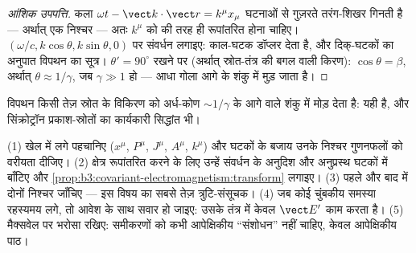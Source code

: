 \begin{proof}[आंशिक उपपत्ति]
कला $\omega t - \vect k\cdot\vect r = k^\mu x_\mu$ घटनाओं से गुज़रते
तरंग-शिखर गिनती है --- अर्थात् एक निश्चर --- अतः $k^\mu$ को
 की तरह ही रूपांतरित होना चाहिए। $(\omega/c, k\cos\theta,
k\sin\theta, 0)$ पर संवर्धन लगाइए: काल-घटक डॉप्लर देता है, और
दिक्-घटकों का अनुपात विपथन का सूत्र। $\theta' =
90^\circ$ रखने पर (अर्थात् स्रोत-तंत्र की बगल वाली किरण): $\cos\theta =
\beta$, अर्थात् $\theta \approx 1/\gamma$, जब $\gamma \gg 1$ हो ---
आधा गोला आगे के शंकु में मुड़ जाता है।
\end{proof}

\begin{omfigure}

{\small विपथन किसी तेज़ स्रोत के विकिरण को अर्ध-कोण $\sim 1/\gamma$ के
आगे वाले शंकु में मोड़ देता है: यही  है, और
सिंक्रोट्रॉन प्रकाश-स्रोतों का कार्यकारी सिद्धांत भी।}
\end{omfigure}

\begin{method}\label{met:b3:covariant-electromagnetism:method}
(1) खेल में लगे  पहचानिए ($x^\mu$, $P^\mu$, $J^\mu$,
$A^\mu$, $k^\mu$) और घटकों के बजाय उनके निश्चर गुणनफलों को वरीयता
दीजिए। (2) क्षेत्र रूपांतरित करने के लिए उन्हें संवर्धन के अनुदिश और
अनुप्रस्थ घटकों में बाँटिए और
\cref{prop:b3:covariant-electromagnetism:transform} लगाइए। (3) पहले
और बाद में दोनों निश्चर जाँचिए --- इस विषय का सबसे तेज़ त्रुटि-संसूचक।
(4) जब कोई चुंबकीय समस्या रहस्यमय लगे, तो आवेश के साथ सवार हो
जाइए: उसके तंत्र में केवल $\vect E'$ काम करता है। (5) मैक्सवेल पर
भरोसा रखिए: समीकरणों को कभी आपेक्षिकीय ``संशोधन'' नहीं चाहिए, केवल
आपेक्षिकीय पाठ।
\end{method}

